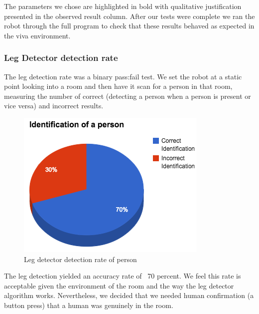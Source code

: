 \documentclass{article}
\begin{document}
	The parameters we chose are highlighted in bold with qualitative justification presented in the observed result column. After our tests were complete we ran the robot through the full program to check that these results behaved as expected in the viva environment.
	
	\subsubsection{Leg Detector detection rate}
	The leg detection rate was a binary pass:fail test. We set the robot at a static point looking into a room and then have it scan for a person in that room, measuring the number of correct (detecting a person when a person is present or vice versa) and incorrect results.
	\begin{figure}[H]
	\begin{center}
	\includegraphics[width=0.8\linewidth]{ExperimentalResults11}
	\caption{Leg detector detection rate of person}
	\end{center}
	\end{figure}


\columnbreak
\vspace*{12.5cm}	
	
	The leg detection yielded an accuracy rate of ~70 percent. We feel this rate is acceptable given the environment of the room and the way the leg detector algorithm works. Nevertheless, we decided that we needed human confirmation (a button press) that a human was genuinely in the room.
	
\end{document}
